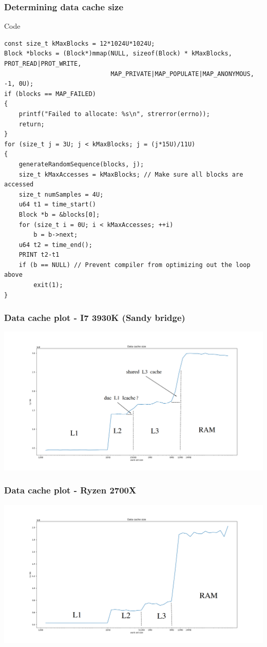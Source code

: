\documentclass{beamer}
\begin{document}
\begin{frame}[fragile]
\frametitle{Determining data cache size}
\begin{block}{Code}
\begin{lstlisting}[style=code]
const size_t kMaxBlocks = 12*1024U*1024U;
Block *blocks = (Block*)mmap(NULL, sizeof(Block) * kMaxBlocks, PROT_READ|PROT_WRITE,
                             MAP_PRIVATE|MAP_POPULATE|MAP_ANONYMOUS, -1, 0U);
if (blocks == MAP_FAILED)
{
    printf("Failed to allocate: %s\n", strerror(errno));
    return;
}
for (size_t j = 3U; j < kMaxBlocks; j = (j*15U)/11U)
{
    generateRandomSequence(blocks, j);
    size_t kMaxAccesses = kMaxBlocks; // Make sure all blocks are accessed
    size_t numSamples = 4U; 
    u64 t1 = time_start()
    Block *b = &blocks[0]; 
    for (size_t i = 0U; i < kMaxAccesses; ++i)
        b = b->next;
    u64 t2 = time_end();
    PRINT t2-t1
    if (b == NULL) // Prevent compiler from optimizing out the loop above
        exit(1);
}

\end{lstlisting}
\end{block}
\end{frame}

\begin{frame}
\frametitle{Data cache plot - I7 3930K (Sandy bridge)}
\includegraphics[scale=.18]{img/data_size.png}
\end{frame}

\begin{frame}
\frametitle{Data cache plot - Ryzen 2700X}
\includegraphics[scale=.25]{img/data_size_zen.png}
\end{frame}
\end{document}
